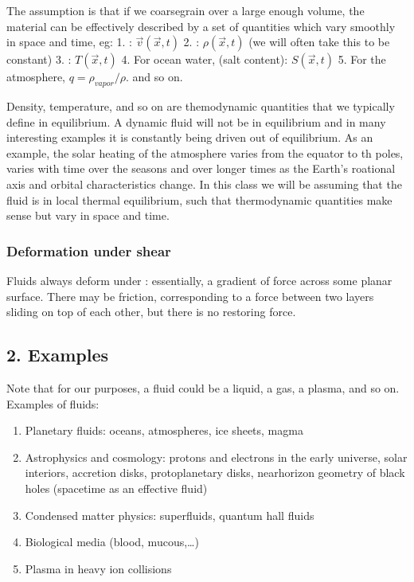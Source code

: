 \documentclass[letterpaper,10pt,english]{jupyterBook}
\begin{document}
\sphinxAtStartPar
The assumption is that if we coarse\sphinxhyphen{}grain over a large enough volume, the
material can be effectively described by a set of quantities which vary
smoothly in space and time, eg:
1. : \({\vec v}({\vec x},t)\)
2. : \(\rho({\vec x},t)\) (we will often take this to be constant)
3. : \(T({\vec x},t)\)
4. For ocean water,  (salt content): \(S({\vec x},t)\)
5. For the atmosphere,  \(q = \rho_{vapor}/\rho\).
and so on.

\sphinxAtStartPar
Density, temperature, and so on are themodynamic quantities that we typically
define in equilibrium. A dynamic fluid will not be in equilibrium and in many
interesting examples it is constantly being driven out of equilibrium. As
an example, the solar heating of the atmosphere varies from the equator to
th poles, varies with time over the seasons and over longer times as
the Earth’s roational axis and orbital characteristics change. In this class
we will be assuming that the fluid is in local thermal equilibrium, such
that thermodynamic quantities make sense but vary in space and time.


\subsubsection{Deformation under shear}
\label{\detokenize{chapter1/whatis_fluid:deformation-under-shear}}
\sphinxAtStartPar
Fluids always deform under : essentially, a gradient of force
across some planar surface. There may be friction, corresponding to a
force between two layers sliding on top of each other, but there is no
restoring force.


\subsection{2. Examples}
\label{\detokenize{chapter1/whatis_fluid:examples}}
\sphinxAtStartPar
Note that for our purposes, a fluid could be a liquid, a gas, a plasma, and
so on.  Examples of fluids:
\begin{enumerate}
%
\item {} 
\sphinxAtStartPar
Planetary fluids: oceans, atmospheres, ice sheets, magma

\item {} 
\sphinxAtStartPar
Astrophysics and cosmology: protons and electrons in the
early universe, solar interiors, accretion disks, protoplanetary disks,
near\sphinxhyphen{}horizon geometry of black holes (spacetime as an effective fluid)

\item {} 
\sphinxAtStartPar
Condensed matter physics: superfluids, quantum hall fluids

\item {} 
\sphinxAtStartPar
Biological media (blood, mucous,…)

\item {} 
\sphinxAtStartPar
Plasma in heavy ion collisions

\end{enumerate}
\end{document}
